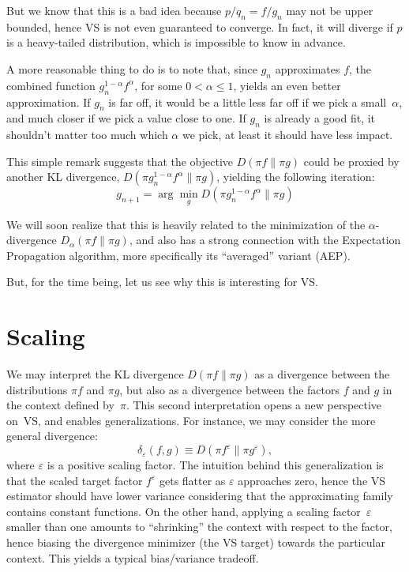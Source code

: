 \documentclass{article}
\begin{document}
But we know that this is a bad idea because $p/q_n=f/g_n$ may not be upper bounded, hence VS is not even guaranteed to converge. In fact, it will diverge if $p$ is a heavy-tailed distribution, which is impossible to know in advance.

A more reasonable thing to do is to note that, since $g_n$ approximates $f$, the combined function $g_n^{1-\alpha}f^\alpha$, for some $0< \alpha\leq 1$, yields an even better approximation. If $g_n$ is far off, it would be a little less far off if we pick a small~$\alpha$, and much closer if we pick a value close to one. If $g_n$ is already a good fit, it shouldn't matter too much which $\alpha$ we pick, at least it should have less impact.

This simple remark suggests that the objective $D(\pi f\|\pi g)$ could be proxied by another KL divergence, $D(\pi g_n^{1-\alpha}f^\alpha \| \pi g)$, yielding the following iteration:
$$
g_{n+1} = \arg\min_g D(\pi g_n^{1-\alpha}f^\alpha \| \pi g)
$$

We will soon realize that this is heavily related to the minimization of the $\alpha$-divergence $D_\alpha(\pi f\|\pi g)$, and also has a strong connection with the Expectation Propagation algorithm, more specifically its ``averaged'' variant (AEP). 

But, for the time being, let us see why this is interesting for VS. 


\section{Scaling}

We may interpret the KL divergence $D(\pi f\|\pi g)$ as a divergence between the distributions $\pi f$ and $\pi g$, but also as a divergence between the factors $f$ and $g$ in the context defined by~$\pi$. This second interpretation opens a new perspective on~VS, and enables generalizations. For instance, we may consider the more general divergence:
$$
\delta_\varepsilon (f, g) \equiv
D(\pi f^\varepsilon \|\pi g^\varepsilon),
$$
where $\varepsilon$ is a positive scaling factor. The intuition behind this generalization is that the scaled target factor $f^\varepsilon$ gets flatter as $\varepsilon$ approaches zero, hence the VS estimator should have lower variance considering that the approximating family contains constant functions. On the other hand, applying a scaling factor~$\varepsilon$ smaller than one amounts to ``shrinking'' the context with respect to the factor, hence biasing the divergence minimizer (the VS target) towards the particular context. This yields a typical bias/variance tradeoff.
\end{document}
